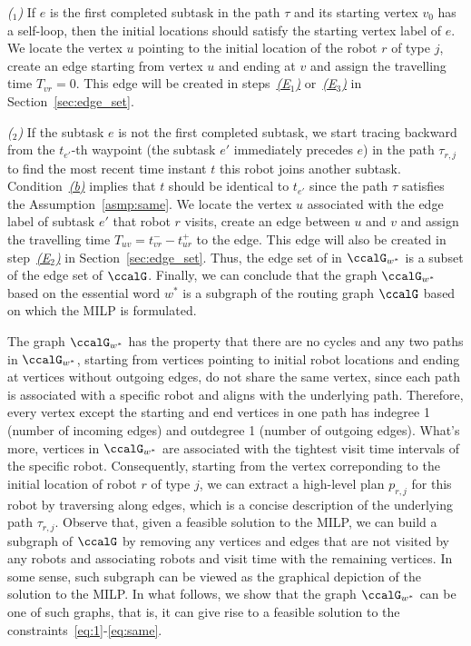 \documentclass[Afour,sageh,times]{sagej}
\newcounter{mycounter}
\begin{document}
{{{\it ($_1$)} If $e$ is the first completed subtask in the path $\tau$ and its starting vertex $v_0$ has a self-loop, then the initial locations should satisfy the starting vertex label of $e$. We locate the vertex $u$ pointing to the initial location of the robot $r$ of type $j$, create an edge starting from vertex $u$ and ending at $v$ and assign the travelling time $T_{vr}=0$. This edge will be created in steps~\hyperref[edge:vertex1]{\it (E$_1$)} or~\hyperref[edge:vertex2]{\it (E$_3$)} in Section~\ref{sec:edge_set}.

{\it ($_2$)} If  the subtask $e$ is not the first completed subtask, we start tracing backward from the $t_{e'}$-th waypoint (the subtask $e'$ immediately precedes  $e$) in the path $\tau_{r,j}$ to find the most recent time instant $t$ this robot joins another subtask. Condition~\hyperref[asmp:b]{\it (b)} implies that $t$ should be identical to $t_{e'}$ since the path $\tau$ satisfies the Assumption~\ref{asmp:same}.  We locate the vertex $u$ associated with the edge label of subtask $e'$ that robot $r$ visits, create an edge between $u$ and $v$ and assign the travelling time $T_{uv} = t_{vr}^- - t_{ur}^+$ to the edge. This edge will also be created in step~\hyperref[edge:vertex2]{\it (E$_2$)} in Section~\ref{sec:edge_set}.  Thus, the edge set of in $\ccalG_{w^*}$ is a subset of the edge set of $\ccalG$. Finally, we can conclude that the graph $\ccalG_{w^*}$ based on the essential word $w^*$ is a subgraph of the routing graph $\ccalG$ based on which the MILP is formulated.


The graph $\ccalG_{w^*}$ has the property that there are no cycles and any two paths in $\ccalG_{w^*}$, starting from vertices pointing to initial robot locations  and ending at vertices without outgoing edges, do not share the same vertex, since each path is associated with a specific robot and aligns with the underlying path. Therefore, every vertex except the starting and end vertices in one path has indegree 1 (number of incoming edges) and outdegree 1 (number of outgoing edges). What's more, vertices in $\ccalG_{w^*}$ are associated with the tightest visit time intervals of the specific robot. Consequently, starting from the vertex correponding to the initial location of robot $r$ of type $j$, we can extract a high-level plan $p_{r,j}$ for this robot by traversing along edges, which is a concise description of the underlying path $\tau_{r,j}$. Observe that, given a feasible solution to the MILP, we can build a subgraph of $\ccalG$ by removing any vertices and edges that are not visited by any robots and associating robots and visit time with the remaining vertices. In some sense, such subgraph can be viewed as the graphical depiction of the solution to the MILP. In what follows, we show that the graph $\ccalG_{w^*}$ can be one of such graphs, that is, it can give rise to a feasible solution to the constraints~\eqref{eq:1}-\eqref{eq:same}.

}}
\end{document}
